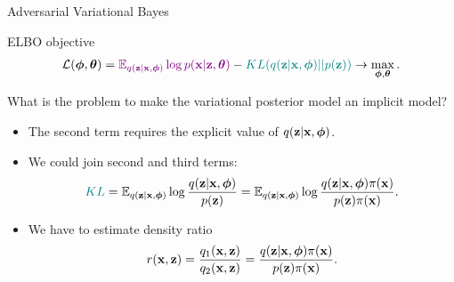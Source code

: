 \begin{frame}{Adversarial Variational Bayes}
	\begin{block}{ELBO objective}
		\vspace{-0.5cm}
		\[
			\mathcal{L} (\boldsymbol{\phi}, \boldsymbol{\theta})  = {\color{violet}\mathbb{E}_{q(\mathbf{z} | \mathbf{x}, \boldsymbol{\phi})} \log p(\mathbf{x} | \mathbf{z}, \boldsymbol{\theta})} - {\color{teal}KL(q(\mathbf{z}| \mathbf{x}, \boldsymbol{\phi}) || p(\mathbf{z}))} \rightarrow \max_{\boldsymbol{\phi}, \boldsymbol{\theta}}.
		\]	
		\vspace{-0.5cm}
	\end{block}
	What is the problem to make the variational posterior model an implicit model?
	\begin{itemize}
	\item {\color{teal}The second term} requires the explicit value of $q(\mathbf{z} | \mathbf{x}, \boldsymbol{\phi})$.
	\item We could join second and third terms:
		\vspace{-0.2cm}
		{\small
		\[
			{\color{teal}KL} = \mathbb{E}_{q(\mathbf{z} | \mathbf{x}, \boldsymbol{\phi})} \log \frac{q(\mathbf{z}| \mathbf{x}, \boldsymbol{\phi})}{p(\mathbf{z})} = \mathbb{E}_{q(\mathbf{z} | \mathbf{x}, \boldsymbol{\phi})} \log \frac{q(\mathbf{z}| \mathbf{x}, \boldsymbol{\phi}) \pi (\mathbf{x})}{p(\mathbf{z}) \pi(\mathbf{x})}.
		\]
		}
		\vspace{-0.5cm}
	\item We have to estimate density ratio 
		\vspace{-0.2cm}
		\[
			r(\mathbf{x}, \mathbf{z}) = \frac{q_1(\mathbf{x}, \mathbf{z})}{q_2(\mathbf{x}, \mathbf{z})} = \frac{q(\mathbf{z}| \mathbf{x}, \boldsymbol{\phi}) \pi (\mathbf{x})}{p(\mathbf{z}) \pi(\mathbf{x})}.
		\] 
	\end{itemize}
\end{frame}
